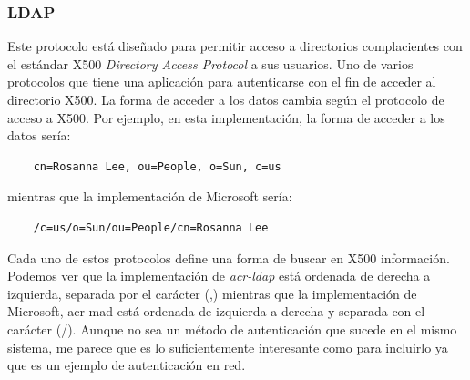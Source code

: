 \documentclass[titlepage, 12pt, a4paper]{article}
\begin{document}
\subsubsection{\gls{LDAP}}
Este protocolo está diseñado para permitir acceso a directorios complacientes con el estándar \gls{X500} \textit{Directory Access Protocol} a sus usuarios. Uno de varios protocolos que tiene una aplicación para autenticarse con el fin de acceder al directorio \gls{X500}\cite{LDAP}. La forma de acceder a los datos cambia según el protocolo de acceso a \gls{X500}. Por ejemplo, en esta implementación, la forma de acceder a los datos sería:
\begin{lstlisting}
	cn=Rosanna Lee, ou=People, o=Sun, c=us
\end{lstlisting}
mientras que la implementación de Microsoft sería:
\begin{lstlisting}
	/c=us/o=Sun/ou=People/cn=Rosanna Lee
\end{lstlisting}
Cada uno de estos protocolos define una forma de buscar en \gls{X500} información. Podemos ver que la implementación de \textit{\gls{acr-ldap}} está ordenada de derecha a izquierda, separada por el carácter (,) mientras que la implementación de Microsoft, \gls{acr-mad} está ordenada de izquierda a derecha y separada con el carácter (/).
Aunque no sea un método de autenticación que sucede en el mismo sistema, me parece que es lo suficientemente interesante como para incluirlo ya que es un ejemplo de autenticación en red.
\end{document}
